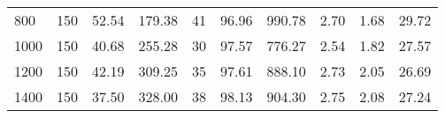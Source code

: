 \begin{table}[H]
{{\begin{tabular}{lrrrrrrrrr}
                800        & 150                  & 52.54             & 179.38          & 41       & 96.96          & 990.78                     & 2.70      & 1.68              & 29.72                    \\
                1000       & 150                  & 40.68             & 255.28          & 30       & 97.57          & 776.27                     & 2.54      & 1.82              & 27.57                    \\
                1200       & 150                  & 42.19             & 309.25          & 35       & 97.61          & 888.10                     & 2.73      & 2.05              & 26.69                    \\
                1400       & 150                  & 37.50             & 328.00          & 38       & 98.13          & 904.30                     & 2.75      & 2.08              & 27.24                    \\
                \bottomrule
            \end{tabular}
        }
    }
\end{table}